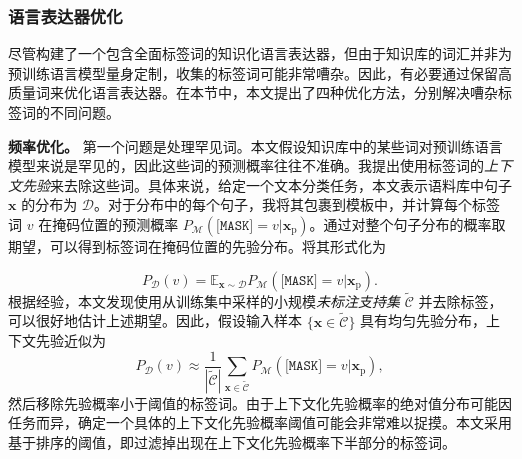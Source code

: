 \begin{table*}[!htbp]
    \centering
    \caption{扩展标签词的示例。}
    \label{tab:label_words_examples}
\end{table*}

\subsubsection{语言表达器优化}
\label{sec:refine}

尽管构建了一个包含全面标签词的知识化语言表达器，但由于知识库的词汇并非为预训练语言模型量身定制，收集的标签词可能非常嘈杂。因此，有必要通过保留高质量词来优化语言表达器。在本节中，本文提出了四种优化方法，分别解决嘈杂标签词的不同问题。

\textbf{频率优化。} 第一个问题是处理罕见词。本文假设知识库中的某些词对预训练语言模型来说是罕见的，因此这些词的预测概率往往不准确。我提出使用标签词的\emph{上下文先验}来去除这些词。具体来说，给定一个文本分类任务，本文表示语料库中句子 $\mathbf{x}$ 的分布为 $\mathcal{D}$。对于分布中的每个句子，我将其包裹到模板中，并计算每个标签词 $v$ 在掩码位置的预测概率 $P_{\mathcal{M}}(\texttt{[MASK]}\!\!\!=\!v|\mathbf{x}_{\text{p}})$。通过对整个句子分布的概率取期望，可以得到标签词在掩码位置的先验分布。将其形式化为

\begin{equation}
 P_{\mathcal{D}}(v)\! =\! \mathbb{E}_{\mathbf{x}\sim \mathcal{D}} P_{\mathcal{M}}(\texttt{[MASK]}\!\!\!=\!v|\mathbf{x}_{\text{p}}).
\end{equation}
根据经验，本文发现使用从训练集中采样的小规模\emph{未标注支持集} $\tilde{\mathcal{C}}$ 并去除标签，可以很好地估计上述期望。因此，假设输入样本 $\{\mathbf{x}\in \tilde{\mathcal{C}}\}$ 具有均匀先验分布，上下文先验近似为
\begin{equation}
    P_{\mathcal{D}}(v) \approx \frac{1}{|\tilde{\mathcal{C}}|} \sum_{\mathbf{x}\in \tilde{\mathcal{C}}} P_{\mathcal{M}}(\texttt{[MASK]}\!\!\!=\!v|\mathbf{x}_{\text{p}}),
\end{equation}
然后移除先验概率小于阈值的标签词。由于上下文化先验概率的绝对值分布可能因任务而异，确定一个具体的上下文化先验概率阈值可能会非常难以捉摸。本文采用基于排序的阈值，即过滤掉出现在上下文化先验概率下半部分的标签词。


